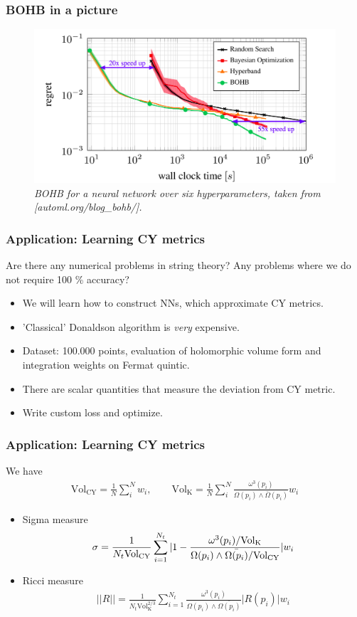 \documentclass{beamer}
\newcommand{\bi}{\begin{itemize}}
\newcommand{\ei}{\end{itemize}}
\newcommand{\volk}{\text{Vol}_\text{K}}
\newcommand{\volcy}{\text{Vol}_\text{CY}}
\begin{document}
\begin{frame}
\frametitle{BOHB in a picture}
\begin{figure}[t]
	\centering
	\includegraphics[scale=0.27]{bohb.png}
	\caption{\it BOHB for a neural network over six hyperparameters, taken from {\color{blue} [automl.org/blog\_bohb/]}.}
	\label{fig:bohb}
\end{figure}
\end{frame}

\begin{frame}
\frametitle{Application: Learning CY metrics}
Are there any numerical problems in string theory? Any problems where we do not require 100 \% accuracy? 
\bi
\item We will learn how to construct NNs, which approximate CY metrics.
\item 'Classical' Donaldson algorithm is {\it very} expensive.
\item Dataset: 100.000 points, evaluation of holomorphic volume form and integration weights on Fermat quintic.
\pause
\item There are scalar quantities that measure the deviation from CY metric.
\item Write custom loss and optimize.
\ei
\end{frame}

\begin{frame}
\frametitle{Application: Learning CY metrics}
We have
\begin{align}
	\volcy = \frac{1}{N} \sum_i^N w_i, \qquad \volk = \frac{1}{N} \sum_i^N \frac{\omega^3(p_i)}{\Omega (p_i) \wedge \bar{\Omega} (p_i) } w_i 
\end{align}
\bi
\item Sigma measure
\begin{align}
\sigma  = \frac{1}{N_t \volcy} \sum_{i = 1}^{N_t} \arrowvert 1 - \frac{\omega^3(p_i) / \volk }{ \Omega(p_i) \wedge \bar{\Omega(p_i)} / \volcy} \arrowvert w_i
\end{align}
\item Ricci measure
\begin{align}
|| R ||  = \frac{1}{N_t \volk^{2/3}} \sum_{i = 1}^{N_t}  \frac{\omega^3(p_i) }{ \Omega(p_i) \wedge \bar{\Omega(p_i)} } \lvert R(p_i) \rvert w_i
\end{align}
\ei
\end{frame}
\end{document}
